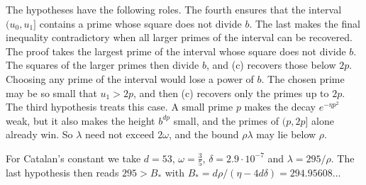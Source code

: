 \documentclass[11pt]{amsart}
\newcommand{\Bstar}{294.95608}
\theoremstyle{definition}
\theoremstyle{remark}
\numberwithin{equation}{section}
\begin{document}
The hypotheses have the following roles. The fourth ensures that the interval $(u_0,u_1]$ contains a prime
whose square does not divide $b$. The last makes the final inequality contradictory when all larger primes
of the interval can be recovered. The proof takes the largest prime of the interval whose square does not
divide $b$. The squares of the larger primes then divide $b$, and (c) recovers those below $2p$. Choosing
any prime of the interval would lose a power of $b$. The chosen prime may be so small that $u_1>2p$, and then
(c) recovers only the primes up to $2p$. The third hypothesis treats this case. A small prime $p$ makes the
decay $e^{-\eta p^2}$ weak, but it also makes the height $b^{dp}$ small, and the primes of $(p,2p]$ alone
already win. So $\lambda$ need not exceed $2\omega$, and the bound $\rho\lambda$ may lie below $\rho$.

For Catalan's constant we take $d=53$, $\omega=\frac35$, $\delta=2.9\cdot10^{-7}$ and $\lambda=295/\rho$.
The last hypothesis then reads $295>B_*$ with $B_*=d\rho/(\eta-4d\delta)=\Bstar\ldots$








\appendix




\end{document}
